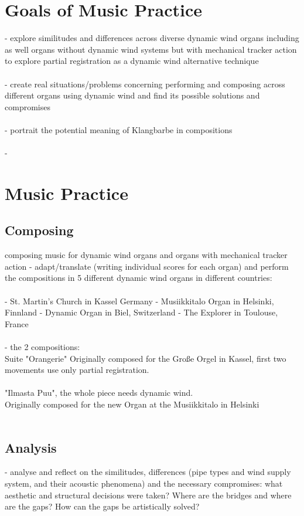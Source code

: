 \documentclass[11pt, oneside]{report}   	%
\begin{document}
\section{Goals of Music Practice}

- explore similitudes and differences across diverse dynamic wind organs including as well organs without dynamic wind systems but with mechanical tracker action to explore partial registration as a dynamic wind alternative technique\\
\\
- create real situations/problems concerning performing and composing across different organs using dynamic wind and find its possible solutions and compromises\\
\\
- portrait the potential meaning of Klangbarbe in compositions\\
\\
- 
\section{Music Practice}

\subsection{Composing} 
composing music for dynamic wind organs and organs with mechanical tracker action 
- adapt/translate (writing individual scores for each organ) and perform the compositions in 5 different dynamic wind organs in different countries: \\
\\
- St. Martin's Church in Kassel Germany
- Musiikkitalo Organ in Helsinki, Finnland
- Dynamic Organ in Biel, Switzerland
- The Explorer in Toulouse, France\\
\\
- the 2 compositions: 
\\
Suite "Orangerie" 
Originally composed for the Große Orgel in Kassel, first two movements use only partial registration.\\
\\
"Ilmasta Puu", the whole piece needs dynamic wind.\\
Originally composed for the new Organ at the Musiikkitalo in Helsinki\\
\\
\subsection{Analysis}
- analyse and reflect on the similitudes, differences (pipe types and wind supply system, and their acoustic phenomena) and the necessary compromises: what aesthetic and structural decisions were taken? Where are the bridges and where are the gaps? How can the gaps be artistically solved?\\
\\
\end{document}
